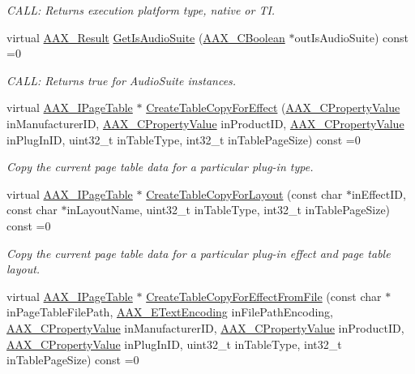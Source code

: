 \begin{DoxyCompactItemize}
\begin{DoxyCompactList}\small\item\em C\+A\+LL\+: Returns execution platform type, native or TI. \end{DoxyCompactList}\item 
virtual \mbox{\hyperlink{a00392_a4d8f69a697df7f70c3a8e9b8ee130d2f}{A\+A\+X\+\_\+\+Result}} \mbox{\hyperlink{a01789_af6d44bc336c3c2e4cca1a1684b556db3}{Get\+Is\+Audio\+Suite}} (\mbox{\hyperlink{a00392_aa216506530f1d19a2965931ced2b274b}{A\+A\+X\+\_\+\+C\+Boolean}} $\ast$out\+Is\+Audio\+Suite) const =0
\begin{DoxyCompactList}\small\item\em C\+A\+LL\+: Returns true for Audio\+Suite instances. \end{DoxyCompactList}\item 
virtual \mbox{\hyperlink{a01849}{A\+A\+X\+\_\+\+I\+Page\+Table}} $\ast$ \mbox{\hyperlink{a01789_acd6c896d35ee2c36e8f6685f0c8592ad}{Create\+Table\+Copy\+For\+Effect}} (\mbox{\hyperlink{a00392_ab247c0d8686c14e05cbb567ef276f249}{A\+A\+X\+\_\+\+C\+Property\+Value}} in\+Manufacturer\+ID, \mbox{\hyperlink{a00392_ab247c0d8686c14e05cbb567ef276f249}{A\+A\+X\+\_\+\+C\+Property\+Value}} in\+Product\+ID, \mbox{\hyperlink{a00392_ab247c0d8686c14e05cbb567ef276f249}{A\+A\+X\+\_\+\+C\+Property\+Value}} in\+Plug\+In\+ID, uint32\+\_\+t in\+Table\+Type, int32\+\_\+t in\+Table\+Page\+Size) const =0
\begin{DoxyCompactList}\small\item\em Copy the current page table data for a particular plug-\/in type. \end{DoxyCompactList}\item 
virtual \mbox{\hyperlink{a01849}{A\+A\+X\+\_\+\+I\+Page\+Table}} $\ast$ \mbox{\hyperlink{a01789_ab35931f5055849da04566d51e17665af}{Create\+Table\+Copy\+For\+Layout}} (const char $\ast$in\+Effect\+ID, const char $\ast$in\+Layout\+Name, uint32\+\_\+t in\+Table\+Type, int32\+\_\+t in\+Table\+Page\+Size) const =0
\begin{DoxyCompactList}\small\item\em Copy the current page table data for a particular plug-\/in effect and page table layout. \end{DoxyCompactList}\item 
virtual \mbox{\hyperlink{a01849}{A\+A\+X\+\_\+\+I\+Page\+Table}} $\ast$ \mbox{\hyperlink{a01789_aad15c4d6b9943cdd9a5143622524eb1e}{Create\+Table\+Copy\+For\+Effect\+From\+File}} (const char $\ast$in\+Page\+Table\+File\+Path, \mbox{\hyperlink{a00491_a8152e57310850693e4e7f00fc4922d74}{A\+A\+X\+\_\+\+E\+Text\+Encoding}} in\+File\+Path\+Encoding, \mbox{\hyperlink{a00392_ab247c0d8686c14e05cbb567ef276f249}{A\+A\+X\+\_\+\+C\+Property\+Value}} in\+Manufacturer\+ID, \mbox{\hyperlink{a00392_ab247c0d8686c14e05cbb567ef276f249}{A\+A\+X\+\_\+\+C\+Property\+Value}} in\+Product\+ID, \mbox{\hyperlink{a00392_ab247c0d8686c14e05cbb567ef276f249}{A\+A\+X\+\_\+\+C\+Property\+Value}} in\+Plug\+In\+ID, uint32\+\_\+t in\+Table\+Type, int32\+\_\+t in\+Table\+Page\+Size) const =0

\end{DoxyCompactItemize}
